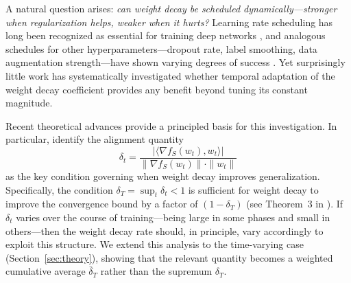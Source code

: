 \documentclass{article}
\begin{document}
A natural question arises: \emph{can weight decay be scheduled dynamically---stronger
when regularization helps, weaker when it hurts?}
Learning rate scheduling has long been recognized as essential for training deep
networks \citep{smith2017cyclical, loshchilov2017sgdr}, and analogous schedules for
other hyperparameters---dropout rate, label smoothing, data augmentation
strength---have shown varying degrees of success
\citep{morerio2017curriculum, zhang2018mixup}.
Yet surprisingly little work has systematically investigated whether temporal
adaptation of the weight decay coefficient provides any benefit beyond tuning its
constant magnitude.

Recent theoretical advances provide a principled basis for this investigation.
In particular, \citet{xie2024investigating} identify the alignment quantity
\begin{equation}
  \delta_t = \frac{|\langle \nabla f_S(w_t), w_t \rangle|}
                  {\|\nabla f_S(w_t)\| \cdot \|w_t\|}
\end{equation}
as the key condition governing when weight decay improves generalization.
Specifically, the condition $\delta_T = \sup_t \delta_t < 1$ is sufficient for
weight decay to improve the convergence bound by a factor of $(1 - \delta_T)$
(see Theorem~3 in \citealt{xie2024investigating}).
If $\delta_t$ varies over the course of training---being large in some phases and
small in others---then the weight decay rate should, in principle, vary accordingly
to exploit this structure.
We extend this analysis to the time-varying case (Section~\ref{sec:theory}), showing
that the relevant quantity becomes a weighted cumulative average $\bar{\delta}_T$
rather than the supremum $\delta_T$.
\end{document}
